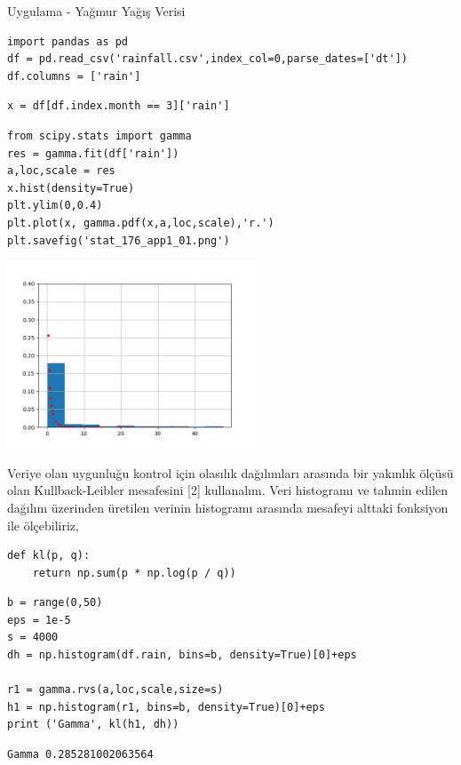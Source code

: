\documentclass[12pt,fleqn]{article}\usepackage{../../common}
\begin{document}
Uygulama - Yağmur Yağış Verisi

\begin{verbatim}
import pandas as pd
df = pd.read_csv('rainfall.csv',index_col=0,parse_dates=['dt'])
df.columns = ['rain']
\end{verbatim}

\begin{verbatim}
x = df[df.index.month == 3]['rain']
\end{verbatim}

\begin{verbatim}
from scipy.stats import gamma
res = gamma.fit(df['rain'])
a,loc,scale = res  
x.hist(density=True)
plt.ylim(0,0.4)
plt.plot(x, gamma.pdf(x,a,loc,scale),'r.')
plt.savefig('stat_176_app1_01.png')
\end{verbatim}

\includegraphics[width=20em]{stat_176_app1_01.png}

Veriye olan uygunluğu kontrol için olasılık dağılımları arasında bir yakınlık
ölçüsü olan Kullback-Leibler mesafesini [2] kullanalım. Veri histogramı ve
tahmin edilen dağılım üzerinden üretilen verinin histogramı arasında mesafeyi
alttaki fonksiyon ile ölçebiliriz,

\begin{verbatim}
def kl(p, q):
    return np.sum(p * np.log(p / q))    
\end{verbatim}

\begin{verbatim}
b = range(0,50)
eps = 1e-5
s = 4000
dh = np.histogram(df.rain, bins=b, density=True)[0]+eps

r1 = gamma.rvs(a,loc,scale,size=s)
h1 = np.histogram(r1, bins=b, density=True)[0]+eps
print ('Gamma', kl(h1, dh))
\end{verbatim}

\begin{verbatim}
Gamma 0.285281002063564
\end{verbatim}
\end{document}
